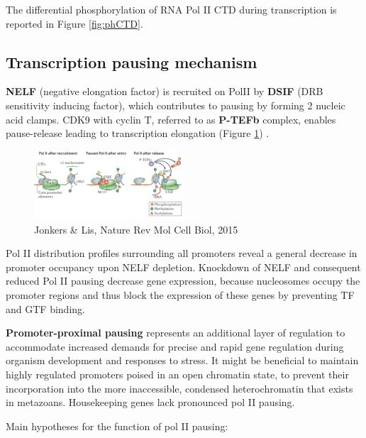 The differential phosphorylation of RNA Pol II CTD during transcription is reported in Figure \ref{fig:phCTD}.

\hypertarget{transcription-pausing-mechanism}{%
\subsection{Transcription pausing mechanism}\label{transcription-pausing-mechanism}}

\textbf{NELF} (negative elongation factor) is recruited on PolII by \textbf{DSIF} (DRB sensitivity inducing factor), which contributes to pausing by forming 2 nucleic acid clamps. CDK9 with cyclin T, referred to as \textbf{P-TEFb} complex, enables pause-release leading to transcription elongation (Figure \ref{fig:dsif}) .

\begin{figure}
\centering
\includegraphics[width=0.5\textwidth]{../_resources/Screenshot_2022-09-22_at_22-14-15.png}
\caption{Jonkers \& Lis, Nature Rev Mol Cell Biol, 2015}
\label{fig:dsif}
\end{figure}

Pol II distribution profiles surrounding all promoters reveal a general decrease in promoter occupancy upon NELF depletion. Knockdown of NELF and consequent reduced Pol II pausing decrease gene expression, because nucleosomes occupy the promoter regions and thus block the expression of these genes by preventing TF and GTF binding.

\textbf{Promoter-proximal pausing} represents an additional layer of regulation to accommodate increased demands for precise and rapid gene regulation during organism development and responses to stress. It might be beneficial to maintain highly regulated promoters poised in an open chromatin state, to prevent their incorporation into the more inaccessible, condensed heterochromatin that exists in metazoans. Housekeeping genes lack pronounced pol II pausing.

Main hypotheses for the function of pol II pausing:

